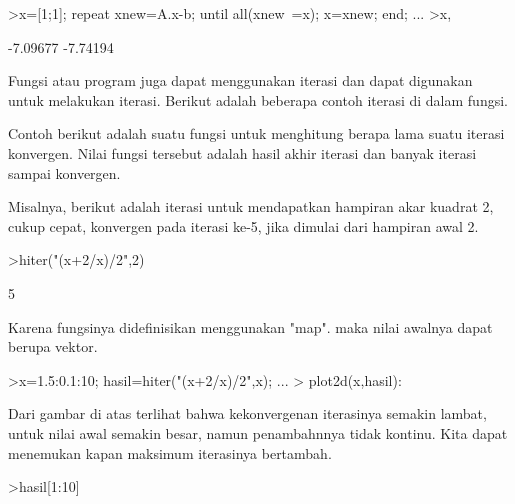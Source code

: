 \documentclass[a4paper,10pt]{article}
\begin{document}
\begin{eulernotebook}
\begin{eulercomment}
\begin{eulercomment}
\begin{eulercomment}
\begin{eulercomment}
\begin{eulerprompt}
>x=[1;1]; repeat xnew=A.x-b; until all(xnew~=x); x=xnew; end; ...
>x,
\end{eulerprompt}
\begin{euleroutput}
       -7.09677 
       -7.74194 
\end{euleroutput}
\begin{eulercomment}
Fungsi atau program juga dapat menggunakan iterasi dan dapat digunakan untuk melakukan iterasi. Berikut adalah beberapa contoh
iterasi di dalam fungsi.

Contoh berikut adalah suatu fungsi untuk menghitung berapa lama suatu iterasi konvergen. Nilai fungsi tersebut adalah hasil akhir
iterasi dan banyak iterasi sampai konvergen.
\end{eulercomment}
\begin{eulercomment}
Misalnya, berikut adalah iterasi untuk mendapatkan hampiran akar kuadrat 2, cukup cepat,
konvergen pada iterasi ke-5, jika dimulai dari hampiran awal 2.
\end{eulercomment}
\begin{eulerprompt}
>hiter("(x+2/x)/2",2)
\end{eulerprompt}
\begin{euleroutput}
  5
\end{euleroutput}
\begin{eulercomment}
Karena fungsinya didefinisikan menggunakan "map". maka nilai awalnya dapat berupa vektor.
\end{eulercomment}
\begin{eulerprompt}
>x=1.5:0.1:10; hasil=hiter("(x+2/x)/2",x); ...
>  plot2d(x,hasil):
\end{eulerprompt}
\begin{eulercomment}
Dari gambar di atas terlihat bahwa kekonvergenan iterasinya semakin lambat, untuk nilai awal
semakin besar, namun penambahnnya tidak kontinu. Kita dapat menemukan kapan maksimum
iterasinya bertambah.
\end{eulercomment}
\begin{eulerprompt}
>hasil[1:10]
\end{eulerprompt}
\begin{euleroutput}

\end{euleroutput}
\end{eulercomment}
\end{eulercomment}
\end{eulercomment}
\end{eulercomment}
\end{eulernotebook}
\end{document}

